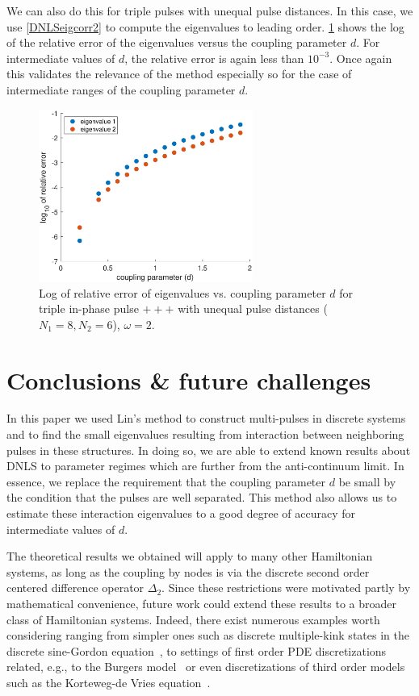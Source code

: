 \documentclass[12pt]{elsarticle}
\begin{document}
We can also do this for triple pulses with unequal pulse distances. In this case, we use \cref{DNLSeigcorr2} to compute the eigenvalues to leading order. \cref{fig:error2} shows the log of the relative error of the eigenvalues versus the coupling parameter $d$.
For intermediate values of $d$, the relative error is again less than $10^{-3}$. Once again this validates the relevance
of the method especially so for the case of 
intermediate ranges of the coupling parameter $d$.

\begin{figure}
\centering
\includegraphics[width=7cm]{errors3.eps}
\caption{Log of relative error of eigenvalues vs. coupling parameter $d$ for triple in-phase pulse $+++$ with unequal pulse distances ($N_1 = 8, N_2 = 6$), $\omega = 2$.}
\label{fig:error2}
\end{figure}

\section{Conclusions \& future challenges}

In this paper we used Lin's method to construct multi-pulses in discrete systems and to find the small eigenvalues resulting from interaction between neighboring pulses in these structures. In doing so, we are able to extend known results about DNLS to parameter regimes which are further from the anti-continuum limit. In essence, we replace the requirement that the coupling parameter $d$ be small by the condition that the pulses are well separated. This method also allows us to estimate these interaction eigenvalues to a good degree of accuracy for intermediate values of $d$.

The theoretical results we obtained will apply to many other Hamiltonian systems, as long as the coupling by nodes is via the discrete second order centered difference operator $\Delta_2$. Since these restrictions were motivated partly by mathematical convenience, future work could extend these results to a broader class of Hamiltonian systems. Indeed, there exist numerous 
examples worth considering ranging from simpler
ones such as discrete multiple-kink states in 
the discrete sine-Gordon equation~\cite{peyrard},
to settings of first order PDE discretizations
related, e.g., to the Burgers model~\cite{turner}
or even discretizations of third order models
such as the Korteweg-de Vries equation~\cite{ohta}. 
\end{document}
